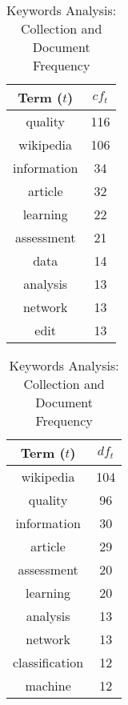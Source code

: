 \begin{table}[ht]
    \caption{Keywords Analysis: Collection and Document Frequency}
    \label{tab:Keywords_analysis}
    \begin{minipage}{.325\textwidth}
        \centering
        \begin{tabular}{c c}
            \toprule
            Term ($t$) & $cf_t$ \\
            \midrule
            quality & 116 \\
            wikipedia & 106 \\
            information & 34 \\
            article & 32 \\
            learning & 22 \\
            assessment & 21 \\
            data & 14 \\
            analysis & 13 \\
            network & 13 \\
            edit & 13 \\
            \bottomrule
        \end{tabular}
    \end{minipage}
    \begin{minipage}{.325\textwidth}
        \centering
        \begin{tabular}{c c}
            \toprule
            Term ($t$) & $df_t$ \\
            \midrule
            wikipedia & 104 \\
            quality & 96 \\
            information & 30 \\
            article & 29 \\
            assessment & 20 \\
            learning & 20 \\
            analysis & 13 \\
            network & 13 \\
            classification & 12 \\
            machine & 12 \\
            \bottomrule
        \end{tabular}
    \end{minipage}
\end{table}
